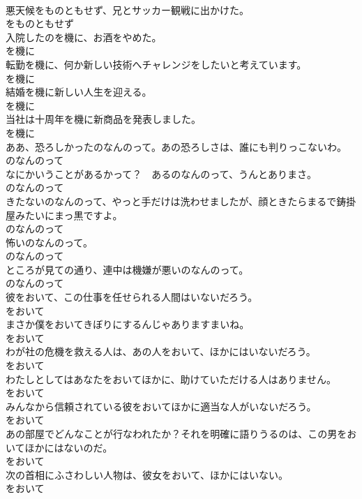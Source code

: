 \documentclass[8pt]{extreport}
\begin{document}
\begin{CJK}{UTF8}{min}
\\	悪天候をものともせず、兄とサッカー観戦に出かけた。	
\\	をものともせず	
\\	入院したのを機に、お酒をやめた。	
\\	を機に	
\\	転勤を機に、何か新しい技術へチャレンジをしたいと考えています。	
\\	を機に	
\\	結婚を機に新しい人生を迎える。	
\\	を機に	
\\	当社は十周年を機に新商品を発表しました。	
\\	を機に	
\\	ああ、恐ろしかったのなんのって。あの恐ろしさは、誰にも判りっこないわ。	
\\	のなんのって	
\\	なにかいうことがあるかって？　あるのなんのって、うんとありまさ。	
\\	のなんのって	
\\	きたないのなんのって、やっと手だけは洗わせましたが、顔ときたらまるで鋳掛屋みたいにまっ黒ですよ。	
\\	のなんのって	
\\	怖いのなんのって。	
\\	のなんのって	
\\	ところが見ての通り、連中は機嫌が悪いのなんのって。	
\\	のなんのって	
\\	彼をおいて、この仕事を任せられる人間はいないだろう。	
\\	をおいて	
\\	まさか僕をおいてきぼりにするんじゃありますまいね。	
\\	をおいて	
\\	わが社の危機を救える人は、あの人をおいて、ほかにはいないだろう。	
\\	をおいて	
\\	わたしとしてはあなたをおいてほかに、助けていただける人はありません。	
\\	をおいて	
\\	みんなから信頼されている彼をおいてほかに適当な人がいないだろう。	
\\	をおいて	
\\	あの部屋でどんなことが行なわれたか？それを明確に語りうるのは、この男をおいてほかにはないのだ。	
\\	をおいて	
\\	次の首相にふさわしい人物は、彼女をおいて、ほかにはいない。	
\\	をおいて	

\end{CJK}
\end{document}
